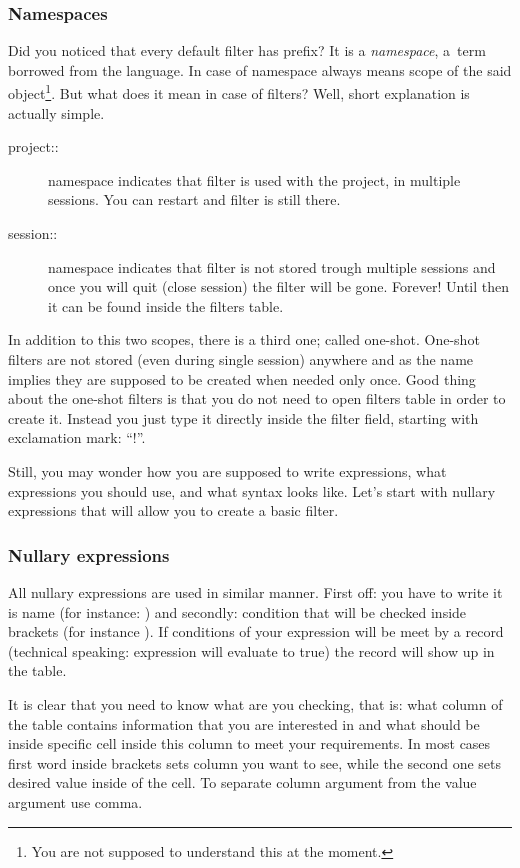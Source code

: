 \subsubsection{Namespaces}
Did you noticed that every default filter has  prefix? It is a \textit{namespace}, a~term borrowed from the \CPP{} language.
In case of \OCS{} namespace always means scope of the said object\footnote{You are not supposed to understand this at the moment.}.
But what does it mean in case of filters? Well, short explanation is actually simple.
\begin{description}
 \item[project::] namespace indicates that filter is used with the project, in multiple sessions. You can restart \OCS{} and filter
 is still there.
 \item[session::] namespace indicates that filter is not stored trough multiple sessions and once you will quit \OCS{} (close session)
 the filter will be gone. Forever! Until then it can be found inside the filters table.
\end{description}
In addition to this two scopes, there is a third one; called one-shot. One-shot filters are not stored (even during single session)
anywhere and as the name implies they are supposed to be created when needed only once. Good thing about the one-shot filters is that
you do not need to open filters table in order to create it. Instead you just type it directly inside the filter field, starting with
exclamation mark: ``!''.

Still, you may wonder how you are supposed to write expressions, what expressions you should use, and what syntax looks like. Let's start
with nullary expressions that will allow you to create a basic filter.

\subsubsection{Nullary expressions}
All nullary expressions are used in similar manner. First off: you have to write it is name (for instance: ) and secondly:
condition that will be checked inside brackets (for instance ). If conditions of your expression will be meet
by a record (technical speaking: expression will evaluate to true) the record will show up in the table.

It is clear that you need to know what are you checking, that is: what column of the table contains information that you are interested
in and what should be inside specific cell inside this column to meet your requirements. In most cases first word inside brackets sets column
you want to see, while the second one sets desired value inside of the cell. To separate column argument from the value argument use comma.  

